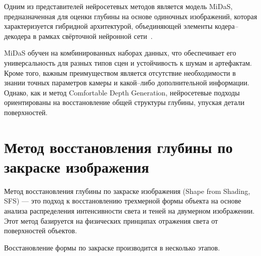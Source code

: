 Одним из представителей нейросетевых методов является модель MiDaS,
предназначенная для оценки глубины на основе одиночных изображений, которая характеризуется гибридной архитектурой,
объединяющей элементы кодера--декодера в рамках свёрточной нейронной сети~\cite{istomin2024, istomin12}.

MiDaS обучен на комбинированных наборах данных, что обеспечивает его универсальность для разных типов сцен
и устойчивость к шумам и артефактам.
Кроме того, важным преимуществом является отсутствие необходимости в знании точных параметров камеры и какой--либо дополнительной информации.
Однако, как и метод Comfortable Depth Generation, нейросетевые подходы ориентированы на восстановление общей структуры глубины, упуская детали поверхностей.

\section{Метод восстановления глубины по закраске изображения}

Метод восстановления глубины по закраске изображения (Shape from Shading, SFS) --- это подход к восстановлению трехмерной формы объекта на основе анализа распределения интенсивности света и теней на двумерном изображении.
Этот метод базируется на физических принципах отражения света от поверхностей объектов.

Восстановление формы по закраске производится в несколько этапов.

